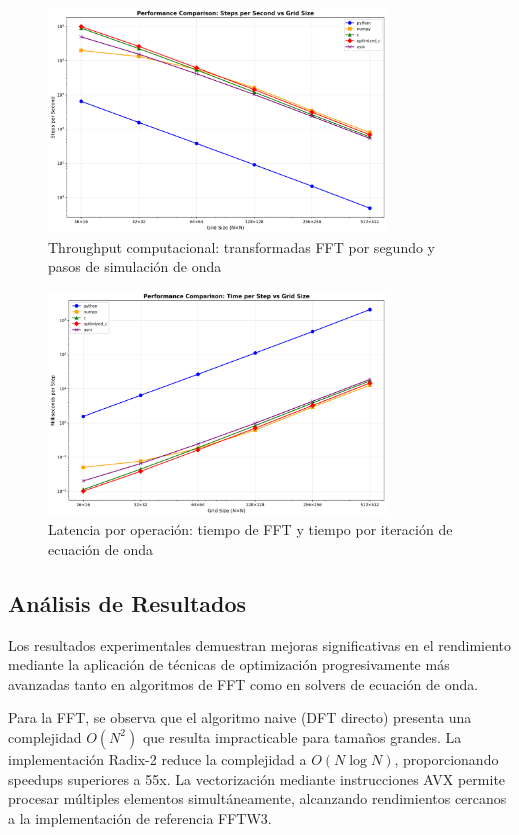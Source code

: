 \documentclass[a4paper]{article}
\begin{document}
\begin{figure}[h]
\centering
\includegraphics[width=0.8\textwidth]{../results/steps_per_second.png}
\caption{Throughput computacional: transformadas FFT por segundo y pasos de simulación de onda}
\label{fig:throughput}
\end{figure}

\begin{figure}[h]
\centering
\includegraphics[width=0.8\textwidth]{../results/milliseconds_per_step.png}
\caption{Latencia por operación: tiempo de FFT y tiempo por iteración de ecuación de onda}
\label{fig:latency}
\end{figure}

\subsection{Análisis de Resultados}

Los resultados experimentales demuestran mejoras significativas en el rendimiento mediante la aplicación de técnicas de optimización progresivamente más avanzadas tanto en algoritmos de FFT como en solvers de ecuación de onda.

Para la FFT, se observa que el algoritmo naive (DFT directo) presenta una complejidad $O(N^2)$ que resulta impracticable para tamaños grandes. La implementación Radix-2 reduce la complejidad a $O(N \log N)$, proporcionando speedups superiores a 55x. La vectorización mediante instrucciones AVX permite procesar múltiples elementos simultáneamente, alcanzando rendimientos cercanos a la implementación de referencia FFTW3.
\end{document}
